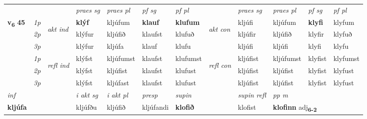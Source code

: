 \begin{longtable}[l]{X>{\footnotesize\itshape}llXXXXlXXXX}
 & &   & \textit{praes sg}  & \textit{praes pl}    & \textit{ pf sg} & \textit{pf pl} & & \textit{praes sg}  & \textit{praes pl}    & \textit{pf sg} & \textit{pf pl }  \\ \cmidrule{4-7} \cmidrule{9-12}
 \multirow{2}{*}{{{\textbf{v{\textsubscript{6}}} \Large{\textbf{45}}}}}  & 1p & \multirow{3}{*}{\begin{turn}{90}\textit{akt ind}\end{turn}} & \textbf{klýf} & kljúfum & \textbf{klauf} & \textbf{klufum} & \multirow{3}{*}{\begin{turn}{90}\textit{akt con}\end{turn}} &kljúfi & kljúfum & \textbf{klyfi} & klyfum\\*
 & 2p &  &  klýfur  & kljúfið & klaufst & klufuð & & kljúfir & kljúfið & klyfir & klyfuð \\*
 & 3p &  & klýfur & kljúfa & klauf & klufu & & kljúfi & kljúfi& klyfi & klyfu \\*
\cmidrule{4-7} \cmidrule{9-12}
 & 1p & \multirow{3}{*}{\begin{turn}{90}\textit{refl ind}\end{turn}}  & klýfst & kljúfumst & klaufst & klufumst & \multirow{3}{*}{\begin{turn}{90}\textit{refl con}\end{turn}}  &kljúfist & kljúfumst & klyfist & klyfumst \\*
 & 2p &  & klýfst & kljúfist & klaufst & klufust & &kljúfist & kljúfist & klyfist & klyfust \\*
 & 3p  & & klýfst & kljúfast & klaufst & klufust & & kljúfist & kljúfist& klyfist & klyfust \\*
\cmidrule{4-7} \cmidrule{9-12}

   {\textit{inf}} & &  & \textit{i akt sg} & \textit{i akt pl}   & \textit{presp} & \textit{supin} && \textit{supin refl} & \textit{pp m} \\*
  {\textbf{kljúfa}} & && kljúfðu  & kljúfið   & kljúfandi &  \textbf{klofið} && klofist & \multicolumn{2}{l}{\textbf{klofinn} adj\textbf{\textsubscript{6-2}}} \\*

\midrule


\end{longtable}
